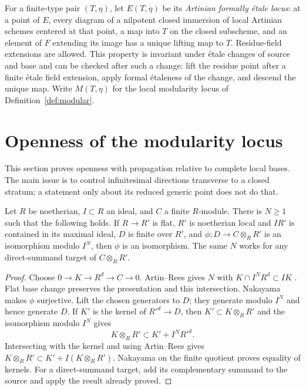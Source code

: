For a finite-type pair $(T,\eta)$, let $E(T,\eta)$ be its \emph{Artinian formally \'etale locus}: at a point of $E$, every diagram of a nilpotent closed immersion of local Artinian schemes centered at that point, a map into $T$ on the closed subscheme, and an element of $F$ extending its image has a unique lifting map to $T$. Residue-field extensions are allowed. This property is invariant under \'etale changes of source and base and can be checked after such a change: lift the residue point after a finite \'etale field extension, apply formal \'etaleness of the change, and descend the unique map. Write $M(T,\eta)$ for the local modularity locus of Definition~\ref{def:modular}.

\section{Openness of the modularity locus}\label{sec:openness}

This section proves openness with propagation relative to complete local bases. The main issue is to control infinitesimal directions transverse to a closed stratum; a statement only about its reduced generic point does not do that.

\begin{lemma}\label{lem:uniform}
Let $R$ be noetherian, $I\subset R$ an ideal, and $C$ a finite $R$-module. There is $N\geq1$ such that the following holds. If $R\to R'$ is flat, $R'$ is noetherian local and $IR'$ is contained in its maximal ideal, $D$ is finite over $R'$, and $\phi:D\to C\otimes_RR'$ is an isomorphism modulo $I^N$, then $\phi$ is an isomorphism. The same $N$ works for any direct-summand target of $C\otimes_RR'$.
\end{lemma}
\begin{proof}
Choose $0\to K\to R^d\to C\to0$. Artin--Rees gives $N$ with $K\cap I^NR^d\subset IK$ \cite[Tag 00IN]{Stacks}. Flat base change preserves the presentation and this intersection. Nakayama makes $\phi$ surjective. Lift the chosen generators to $D$; they generate modulo $I^N$ and hence generate $D$. If $K'$ is the kernel of $R'^d\to D$, then $K'\subset K\otimes_RR'$ and the isomorphism modulo $I^N$ gives
\[
 K\otimes_RR'\subset K'+I^NR'^d.
\]
Intersecting with the kernel and using Artin--Rees gives $K\otimes_RR'\subset K'+I(K\otimes_RR')$. Nakayama on the finite quotient proves equality of kernels. For a direct-summand target, add its complementary summand to the source and apply the result already proved.
\end{proof}

